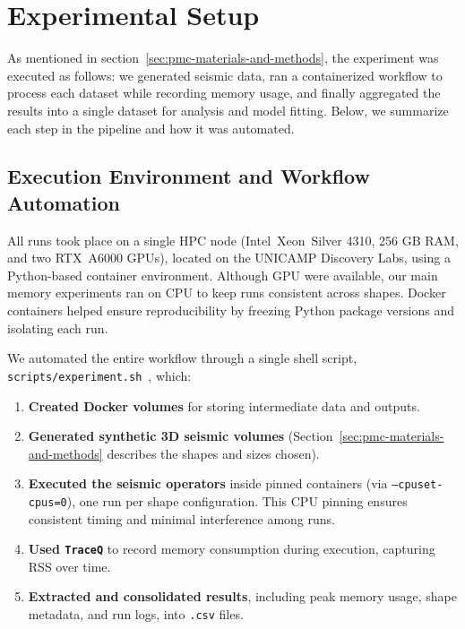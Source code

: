 \section{Experimental Setup}
\label{sec:pmc-experimental-setup}

As mentioned in section~\ref{sec:pmc-materials-and-methods}, the experiment was executed as follows: we generated seismic data, ran a containerized workflow to process each dataset while recording memory usage, and finally aggregated the results into a single dataset for analysis and model fitting.
Below, we summarize each step in the pipeline and how it was automated.

\subsection{Execution Environment and Workflow Automation}
\label{subsec:pmc-execution-environment-and-workflow-automation}

All runs took place on a single \ac{HPC} node (Intel\textregistered\ Xeon\textregistered\ Silver 4310, 256 \ac{GB} \ac{RAM}, and two \ac{RTX}~A6000 \ac{GPU}s), located on the \ac{UNICAMP} Discovery Labs, using a Python-based container environment.
Although \ac{GPU} were available, our main memory experiments ran on \ac{CPU} to keep runs consistent across shapes.
Docker containers helped ensure reproducibility by freezing Python package versions and isolating each run.

We automated the entire workflow through a single shell script,
\texttt{scripts/experiment.sh}~\cite{delucca2025experiment2script}, which:
\begin{enumerate}
    \item \textbf{Created Docker volumes} for storing intermediate data and outputs.
    \item \textbf{Generated synthetic \ac{3D} seismic volumes} (Section~\ref{sec:pmc-materials-and-methods} describes the shapes and sizes chosen).
    \item \textbf{Executed the seismic operators} inside pinned containers (via \texttt{–cpuset-cpus=0}), one run per shape configuration.
    This \ac{CPU} pinning ensures consistent timing and minimal interference among runs.
    \item \textbf{Used \texttt{TraceQ}} to record memory consumption during execution, capturing \ac{RSS} over time.
    \item \textbf{Extracted and consolidated results}, including peak memory usage, shape metadata, and run logs, into \texttt{.csv} files.
\end{enumerate}

